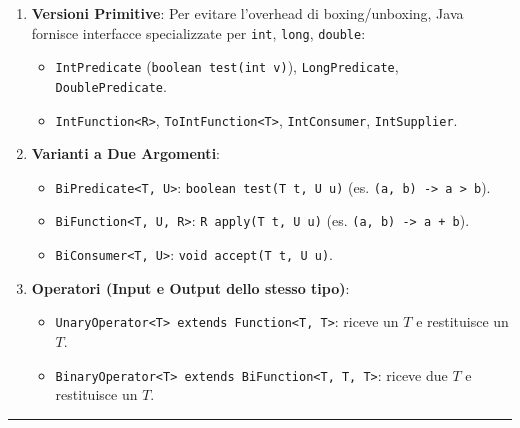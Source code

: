 \documentclass[11pt,a4paper,oneside]{report}
\newcommand{\passthrough}[1]{#1}
\providecommand{\tightlist}{\setlength{\itemsep}{0pt}\setlength{\parskip}{0pt}}
\begin{document}
\begin{enumerate}
\def\labelenumi{\arabic{enumi}.}
\tightlist
\item
  \textbf{Versioni Primitive}: Per evitare l'overhead di
  boxing/unboxing, Java fornisce interfacce specializzate per
  \passthrough{\lstinline!int!}, \passthrough{\lstinline!long!},
  \passthrough{\lstinline!double!}:

  \begin{itemize}
  \tightlist
  \item
    \passthrough{\lstinline!IntPredicate!}
    (\passthrough{\lstinline!boolean test(int v)!}),
    \passthrough{\lstinline!LongPredicate!},
    \passthrough{\lstinline!DoublePredicate!}.
  \item
    \passthrough{\lstinline!IntFunction<R>!},
    \passthrough{\lstinline!ToIntFunction<T>!},
    \passthrough{\lstinline!IntConsumer!},
    \passthrough{\lstinline!IntSupplier!}.
  \end{itemize}
\item
  \textbf{Varianti a Due Argomenti}:

  \begin{itemize}
  \tightlist
  \item
    \passthrough{\lstinline!BiPredicate<T, U>!}:
    \passthrough{\lstinline!boolean test(T t, U u)!} (es.
    \passthrough{\lstinline!(a, b) -> a > b!}).
  \item
    \passthrough{\lstinline!BiFunction<T, U, R>!}:
    \passthrough{\lstinline!R apply(T t, U u)!} (es.
    \passthrough{\lstinline!(a, b) -> a + b!}).
  \item
    \passthrough{\lstinline!BiConsumer<T, U>!}:
    \passthrough{\lstinline!void accept(T t, U u)!}.
  \end{itemize}
\item
  \textbf{Operatori (Input e Output dello stesso tipo)}:

  \begin{itemize}
  \tightlist
  \item
    \passthrough{\lstinline!UnaryOperator<T> extends Function<T, T>!}:
    riceve un \(T\) e restituisce un \(T\).
  \item
    \passthrough{\lstinline!BinaryOperator<T> extends BiFunction<T, T, T>!}:
    riceve due \(T\) e restituisce un \(T\).
  \end{itemize}
\end{enumerate}

\begin{center}\rule{0.5\linewidth}{0.5pt}\end{center}
\end{document}
